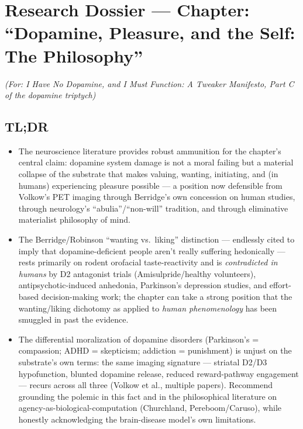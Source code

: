 ﻿\section{Research Dossier --- Chapter: ``Dopamine, Pleasure, and the Self: The Philosophy''}\label{07_pleasure_and_self-research-dossier-chapter-dopamine-pleasure-and-the-self-the-philosophy}

\emph{(For: I Have No Dopamine, and I Must Function: A Tweaker Manifesto, Part C of the dopamine triptych)}

\subsection{TL;DR}\label{07_pleasure_and_self-tldr}

\begin{itemize}
\tightlist
\item
  The neuroscience literature provides robust ammunition for the chapter's central claim: dopamine system damage is not a moral failing but a material collapse of the substrate that makes valuing, wanting, initiating, and (in humans) experiencing pleasure possible --- a position now defensible from Volkow's PET imaging through Berridge's own concession on human studies, through neurology's ``abulia''/``non-will'' tradition, and through eliminative materialist philosophy of mind.
\item
  The Berridge/Robinson ``wanting vs.~liking'' distinction --- endlessly cited to imply that dopamine-deficient people aren't really suffering hedonically --- rests primarily on rodent orofacial taste-reactivity and is \emph{contradicted in humans} by D2 antagonist trials (Amisulpride/healthy volunteers), antipsychotic-induced anhedonia, Parkinson's depression studies, and effort-based decision-making work; the chapter can take a strong position that the wanting/liking dichotomy as applied to \emph{human phenomenology} has been smuggled in past the evidence.
\item
  The differential moralization of dopamine disorders (Parkinson's = compassion; ADHD = skepticism; addiction = punishment) is unjust on the substrate's own terms: the same imaging signature --- striatal D2/D3 hypofunction, blunted dopamine release, reduced reward-pathway engagement --- recurs across all three (Volkow et al., multiple papers). Recommend grounding the polemic in this fact and in the philosophical literature on agency-as-biological-computation (Churchland, Pereboom/Caruso), while honestly acknowledging the brain-disease model's own limitations.
\end{itemize}

